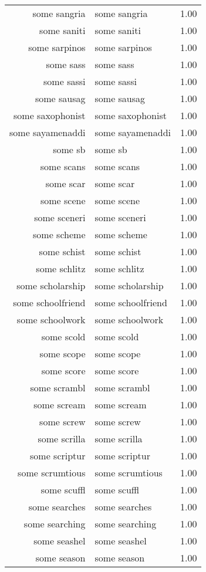 \begin{table}[ht]
\begin{tabular}{rlr}
  some sangria & some sangria & 1.00 \\ 
  some saniti & some saniti & 1.00 \\ 
  some sarpinos & some sarpinos & 1.00 \\ 
  some sass & some sass & 1.00 \\ 
  some sassi & some sassi & 1.00 \\ 
  some sausag & some sausag & 1.00 \\ 
  some saxophonist & some saxophonist & 1.00 \\ 
  some sayamenaddi & some sayamenaddi & 1.00 \\ 
  some sb & some sb & 1.00 \\ 
  some scans & some scans & 1.00 \\ 
  some scar & some scar & 1.00 \\ 
  some scene & some scene & 1.00 \\ 
  some sceneri & some sceneri & 1.00 \\ 
  some scheme & some scheme & 1.00 \\ 
  some schist & some schist & 1.00 \\ 
  some schlitz & some schlitz & 1.00 \\ 
  some scholarship & some scholarship & 1.00 \\ 
  some schoolfriend & some schoolfriend & 1.00 \\ 
  some schoolwork & some schoolwork & 1.00 \\ 
  some scold & some scold & 1.00 \\ 
  some scope & some scope & 1.00 \\ 
  some score & some score & 1.00 \\ 
  some scrambl & some scrambl & 1.00 \\ 
  some scream & some scream & 1.00 \\ 
  some screw & some screw & 1.00 \\ 
  some scrilla & some scrilla & 1.00 \\ 
  some scriptur & some scriptur & 1.00 \\ 
  some scrumtious & some scrumtious & 1.00 \\ 
  some scuffl & some scuffl & 1.00 \\ 
  some searches & some searches & 1.00 \\ 
  some searching & some searching & 1.00 \\ 
  some seashel & some seashel & 1.00 \\ 
  some season & some season & 1.00 \\ 

\end{tabular}
\end{table}
